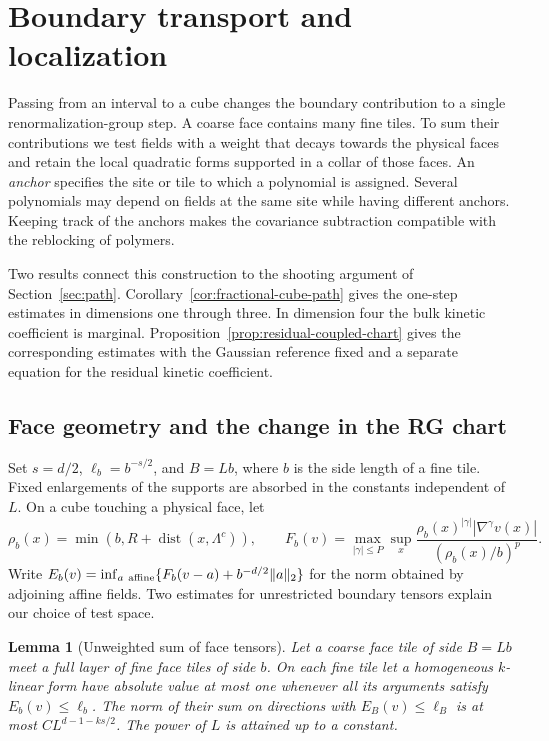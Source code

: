 \documentclass[11pt]{article}
\newtheorem{lemma}[theorem]{Lemma}
\theoremstyle{definition}
\begin{document}
\section{Boundary transport and localization}\label{sec:geometry}

Passing from an interval to a cube changes the boundary contribution
to a single renormalization-group step. A coarse face contains
many fine tiles. To sum their contributions we test fields with a
weight that decays towards the physical faces and retain the local
quadratic forms supported in a collar of those faces. An
\emph{anchor} specifies the site or tile to which a polynomial is
assigned. Several polynomials may depend on fields at the same site
while having different anchors. Keeping track of the anchors makes the
covariance subtraction compatible with the reblocking of polymers.

Two results connect this construction to the shooting argument of
Section~\ref{sec:path}. Corollary~\ref{cor:fractional-cube-path}
gives the one-step estimates in dimensions one through three. In
dimension four the bulk kinetic coefficient is marginal.
Proposition~\ref{prop:residual-coupled-chart} gives the corresponding
estimates with the Gaussian reference fixed and a separate equation
for the residual kinetic coefficient.

\subsection{Face geometry and the change in the RG chart}

Set \(s=d/2\), \(\ell_b=b^{-s/2}\), and \(B=Lb\), where \(b\) is
the side length of a fine tile. Fixed enlargements of the supports
are absorbed in the constants independent of \(L\). On a cube
touching a physical face, let
\begin{equation}
 \rho_b(x)=\min(b,R+\operatorname{dist}(x,\Lambda^c)),\qquad
 F_b(v)=\max_{|\gamma|\le P}\sup_x
 \frac{\rho_b(x)^{|\gamma|}|\nabla^\gamma v(x)|}{(\rho_b(x)/b)^p}.
\end{equation}
Write \(E_b(v)=\inf_{a\ {\rm affine}}\{F_b(v-a)+b^{-d/2}\|a\|_2\}\)
for the norm obtained by adjoining affine fields. Two estimates for
unrestricted boundary tensors explain our choice of test space.

\begin{lemma}[Unweighted sum of face tensors]
\label{lem:face-count}
Let a coarse face tile of side \(B=Lb\) meet a full layer of fine
face tiles of side \(b\). On each fine tile let a homogeneous
\(k\)-linear form have absolute value at most one whenever all
its arguments satisfy \(E_b(v)\le\ell_b\).
The norm of their sum on directions with \(E_B(v)\le\ell_B\) is at
most \(C L^{d-1-ks/2}\). The power of \(L\) is attained up to a constant.
\end{lemma}
\end{document}
